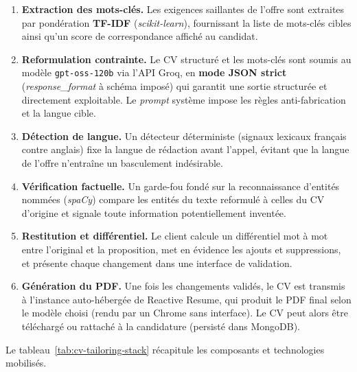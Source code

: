 \begin{sloppypar}
\begin{enumerate}
  \item \textbf{Extraction des mots-clés.} Les exigences saillantes de l'offre sont extraites par pondération \textbf{TF-IDF} (\textit{scikit-learn}), fournissant la liste de mots-clés cibles ainsi qu'un score de correspondance affiché au candidat.
  \item \textbf{Reformulation contrainte.} Le CV structuré et les mots-clés sont soumis au modèle \texttt{gpt-oss-120b} via l'API Groq, en \textbf{mode JSON strict} (\textit{response\_format} à schéma imposé) qui garantit une sortie structurée et directement exploitable. Le \textit{prompt} système impose les règles anti-fabrication et la langue cible.
  \item \textbf{Détection de langue.} Un détecteur déterministe (signaux lexicaux français contre anglais) fixe la langue de rédaction avant l'appel, évitant que la langue de l'offre n'entraîne un basculement indésirable.
  \item \textbf{Vérification factuelle.} Un garde-fou fondé sur la reconnaissance d'entités nommées (\textit{spaCy}) compare les entités du texte reformulé à celles du CV d'origine et signale toute information potentiellement inventée.
  \item \textbf{Restitution et différentiel.} Le client calcule un différentiel mot à mot entre l'original et la proposition, met en évidence les ajouts et suppressions, et présente chaque changement dans une interface de validation.
  \item \textbf{Génération du PDF.} Une fois les changements validés, le CV est transmis à l'instance auto-hébergée de Reactive Resume, qui produit le PDF final selon le modèle choisi (rendu par un Chrome sans interface). Le CV peut alors être téléchargé ou rattaché à la candidature (persisté dans MongoDB).
\end{enumerate}
\end{sloppypar}

Le tableau~\ref{tab:cv-tailoring-stack} récapitule les composants et technologies mobilisés.

